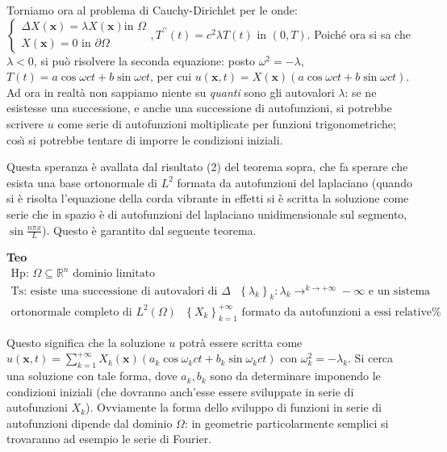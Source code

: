 \documentclass{article}
\begin{document}
Torniamo ora al problema di Cauchy-Dirichlet per le onde: $\left\{ 
\begin{array}{c}
\Delta X\left( \mathbf{x}\right) =\lambda X\left( \mathbf{x}\right) \text{
in }\Omega \\ 
X\left( \mathbf{x}\right) =0\text{ in }\partial \Omega%
\end{array}%
\right. ,T^{\prime \prime }\left( t\right) =c^{2}\lambda T\left( t\right) $
in $\left( 0,T\right) $. Poich\'{e} ora si sa che $\lambda <0$, si pu\`{o}
risolvere la seconda equazione: posto $\omega ^{2}=-\lambda $, $T\left(
t\right) =a\cos \omega ct+b\sin \omega ct$, per cui $u\left( \mathbf{x}%
,t\right) =X\left( \mathbf{x}\right) \left( a\cos \omega ct+b\sin \omega
ct\right) $. Ad ora in realt\`{a} non sappiamo niente su \textit{quanti}
sono gli autovalori $\lambda $: se ne esistesse una successione, e anche una
successione di autofunzioni, si potrebbe scrivere $u$ come serie di
autofunzioni moltiplicate per funzioni trigonometriche; cos\`{\i} si
potrebbe tentare di imporre le condizioni iniziali.

Questa speranza \`{e} avallata dal risultato (2) del teorema sopra, che fa
sperare che esista una base ortonormale di $L^{2}$ formata da autofunzioni
del laplaciano (quando si \`{e} risolta l'equazione della corda vibrante in
effetti si \`{e} scritta la soluzione come serie che in spazio \`{e} di
autofunzioni del laplaciano unidimensionale sul segmento, $\sin \frac{n\pi x%
}{L}$). Questo \`{e} garantito dal seguente teorema.

\textbf{Teo}%
\begin{gather*}
\text{Hp: }\Omega \subseteq 
\mathbb{R}
^{n}\text{ dominio limitato} \\
\text{Ts: esiste una successione di autovalori di }\Delta \text{ }\left\{
\lambda _{k}\right\} _{k}:\lambda _{k}\rightarrow ^{k\rightarrow +\infty
}-\infty \text{ e un sistema} \\
\text{ortonormale completo di }L^{2}\left( \Omega \right) \text{ }\left\{
X_{k}\right\} _{k=1}^{+\infty }\text{ formato da autofunzioni a essi relative%
}
\end{gather*}

Questo significa che la soluzione $u$ potr\`{a} essere scritta come $u\left( 
\mathbf{x},t\right) =\sum_{k=1}^{+\infty }X_{k}\left( \mathbf{x}\right)
\left( a_{k}\cos \omega _{k}ct+b_{k}\sin \omega _{k}ct\right) $ con $\omega
_{k}^{2}=-\lambda _{k}$. Si cerca una soluzione con tale forma, dove $%
a_{k},b_{k}$ sono da determinare imponendo le condizioni iniziali (che
dovranno anch'esse essere sviluppate in serie di autofunzioni $X_{k}$).
Ovviamente la forma dello sviluppo di funzioni in serie di autofunzioni
dipende dal dominio $\Omega $: in geometrie particolarmente semplici si
trovaranno ad esempio le serie di Fourier.
\end{document}
